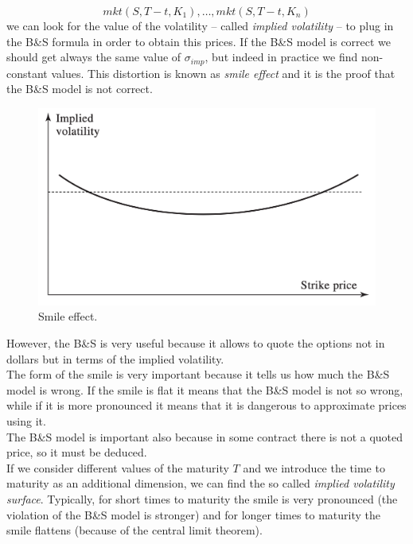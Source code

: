 $$mkt(S,T-t,K_1),\dots,mkt(S,T-t,K_n)$$
we can look for the value of the volatility -- called \emph{implied volatility} -- to plug in the B\&S formula in order to obtain this prices. If the B\&S model is correct we should get always the same value of $\sigma_{imp}$, but indeed in practice we find non-constant values. This distortion is known as \emph{smile effect} and it is the proof that the B\&S model is not correct.
\begin{figure}[htp]
    \centering
    \includegraphics[scale=0.2]{fig/tmp/fig18.png}
    \caption{Smile effect.}
    \label{fig:smile}
\end{figure}
\newline However, the B\&S is very useful because it allows to quote the options not in dollars but in terms of the implied volatility.\\
The form of the smile is very important because it tells us how much the B\&S model is wrong. If the smile is flat it means that the B\&S model is not so wrong, while if it is more pronounced it means that it is dangerous to approximate prices using it.\\
The B\&S model is important also because in some contract there is not a quoted price, so it must be deduced.\\
If we consider different values of the maturity $T$ and we introduce the time to maturity as an additional dimension, we can find the so called \emph{implied volatility surface}. Typically, for short times to maturity the smile is very pronounced (the violation of the B\&S model is stronger) and for longer times to maturity the smile flattens (because of the central limit theorem).
